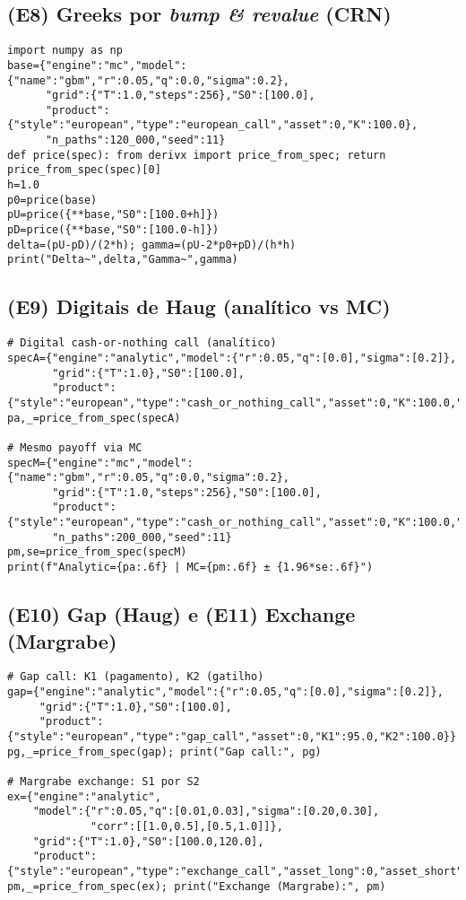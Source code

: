 ﻿\documentclass[11pt,a4paper]{article}
\begin{document}
\subsection{(E8) Greeks por \emph{bump \& revalue} (CRN)}
\begin{lstlisting}[style=pystyle]
import numpy as np
base={"engine":"mc","model":{"name":"gbm","r":0.05,"q":0.0,"sigma":0.2},
      "grid":{"T":1.0,"steps":256},"S0":[100.0],
      "product":{"style":"european","type":"european_call","asset":0,"K":100.0},
      "n_paths":120_000,"seed":11}
def price(spec): from derivx import price_from_spec; return price_from_spec(spec)[0]
h=1.0
p0=price(base)
pU=price({**base,"S0":[100.0+h]})
pD=price({**base,"S0":[100.0-h]})
delta=(pU-pD)/(2*h); gamma=(pU-2*p0+pD)/(h*h)
print("Delta~",delta,"Gamma~",gamma)
\end{lstlisting}

\subsection{(E9) Digitais de Haug (analítico vs MC)}
\begin{lstlisting}[style=pystyle]
# Digital cash-or-nothing call (analítico)
specA={"engine":"analytic","model":{"r":0.05,"q":[0.0],"sigma":[0.2]},
       "grid":{"T":1.0},"S0":[100.0],
       "product":{"style":"european","type":"cash_or_nothing_call","asset":0,"K":100.0,"cash":1.0}}
pa,_=price_from_spec(specA)

# Mesmo payoff via MC
specM={"engine":"mc","model":{"name":"gbm","r":0.05,"q":0.0,"sigma":0.2},
       "grid":{"T":1.0,"steps":256},"S0":[100.0],
       "product":{"style":"european","type":"cash_or_nothing_call","asset":0,"K":100.0,"cash":1.0},
       "n_paths":200_000,"seed":11}
pm,se=price_from_spec(specM)
print(f"Analytic={pa:.6f} | MC={pm:.6f} ± {1.96*se:.6f}")
\end{lstlisting}

\subsection{(E10) Gap (Haug) e (E11) Exchange (Margrabe)}
\begin{lstlisting}[style=pystyle]
# Gap call: K1 (pagamento), K2 (gatilho)
gap={"engine":"analytic","model":{"r":0.05,"q":[0.0],"sigma":[0.2]},
     "grid":{"T":1.0},"S0":[100.0],
     "product":{"style":"european","type":"gap_call","asset":0,"K1":95.0,"K2":100.0}}
pg,_=price_from_spec(gap); print("Gap call:", pg)

# Margrabe exchange: S1 por S2
ex={"engine":"analytic",
    "model":{"r":0.05,"q":[0.01,0.03],"sigma":[0.20,0.30],
             "corr":[[1.0,0.5],[0.5,1.0]]},
    "grid":{"T":1.0},"S0":[100.0,120.0],
    "product":{"style":"european","type":"exchange_call","asset_long":0,"asset_short":1}}
pm,_=price_from_spec(ex); print("Exchange (Margrabe):", pm)
\end{lstlisting}
\end{document}
